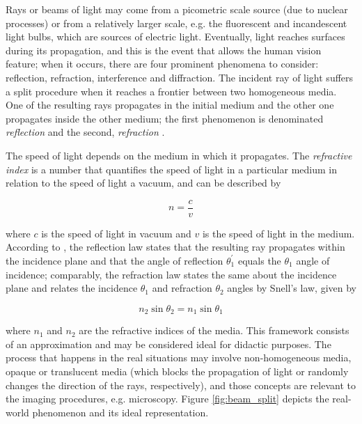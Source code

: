 Rays or beams of light may come from a picometric scale source (due to nuclear processes) or from a relatively larger scale, e.g. the fluorescent and incandescent light bulbs, which are sources of electric light. Eventually, light reaches surfaces during its propagation, and this is the event that allows the human vision feature; when it occurs, there are four prominent phenomena to consider: reflection, refraction, interference and diffraction. The incident ray of light suffers a split procedure when it reaches a frontier between two homogeneous media. One of the resulting rays propagates in the initial medium and the other one propagates inside the other medium; the first phenomenon is denominated \emph{reflection} and the second, \emph{refraction} \cite{born1999principles}.

The speed of light depends on the medium in which it propagates. The \emph{refractive index} is a number that quantifies the speed of light in a particular medium in relation to the speed of light a vacuum, and can be described by

\begin{equation}
    \label{eqn:refractive_index}
       n = \frac{c}{v}
\end{equation}

\noindent where $\mathit{c}$ is the speed of light in vacuum and $\mathit{v}$ is the speed of light in the medium. According to , the reflection law states that the resulting ray propagates within the incidence plane and that the angle of reflection $\mathit{\theta^{'}_{1}}$ equals the $\mathit{\theta_{1}}$ angle of incidence; comparably, the refraction law states the same about the incidence plane and relates the incidence $\mathit{\theta_{1}}$ and refraction $\mathit{\theta_{2}}$ angles by Snell's law, given by

\begin{equation}
    \label{eqn:snells_law}
       n_{2}\sin{\theta_{2}} = n_{1}\sin{\theta_{1}}
\end{equation}

\noindent where $\mathit{n_{1}}$ and $\mathit{n_{2}}$ are the refractive indices of the media. This framework consists of an approximation and may be considered ideal for didactic purposes. The process that happens in the real situations may involve non-homogeneous media, opaque or translucent media (which blocks the propagation of light or randomly changes the direction of the rays, respectively), and those concepts are relevant to the imaging procedures, e.g. microscopy. Figure \ref{fig:beam_split} depicts the real-world phenomenon and its ideal representation.

